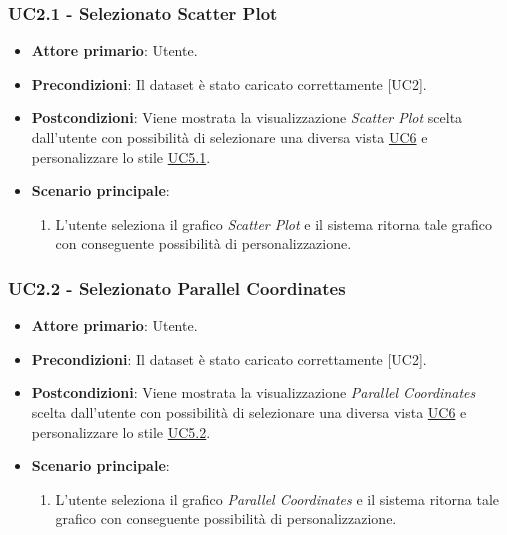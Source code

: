 \subsubsection{UC2.1 - Selezionato Scatter Plot}
\label{sec:UC2.1}
\begin{itemize}
    \item \textbf{Attore primario}: Utente.
    \item \textbf{Precondizioni}: Il dataset è stato caricato correttamente [UC2].
    \item \textbf{Postcondizioni}: Viene mostrata la visualizzazione \textit{Scatter Plot} scelta dall'utente con possibilità di selezionare una diversa vista \hyperref[sec:UC6]{UC6} e personalizzare lo stile \hyperref[sec:UC5.1]{UC5.1}. %
    \item \textbf{Scenario principale}:
          \begin{enumerate}
              \item L'utente seleziona il grafico \textit{Scatter Plot} e il sistema ritorna tale grafico con conseguente possibilità di personalizzazione. 
          \end{enumerate}
\end{itemize}

\subsubsection{UC2.2 - Selezionato Parallel Coordinates}
\label{sec:UC2.2}
\begin{itemize}
    \item \textbf{Attore primario}: Utente.
    \item \textbf{Precondizioni}: Il dataset è stato caricato correttamente [UC2].
    \item \textbf{Postcondizioni}: Viene mostrata la visualizzazione \textit{Parallel Coordinates} scelta dall'utente con possibilità di selezionare una diversa vista \hyperref[sec:UC6]{UC6} e personalizzare lo stile \hyperref[sec:UC5.2]{UC5.2}. %
    \item \textbf{Scenario principale}:
          \begin{enumerate}
              \item L'utente seleziona il grafico \textit{Parallel Coordinates} e il sistema ritorna tale grafico con conseguente possibilità di personalizzazione. 
          \end{enumerate}
\end{itemize}


